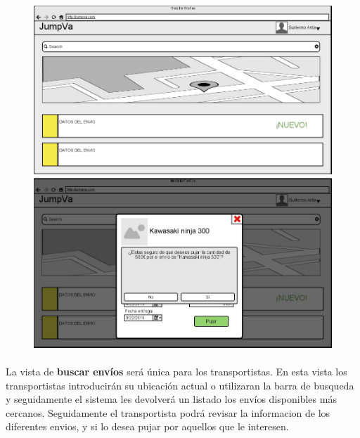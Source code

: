 \documentclass[10pt, a4paper,spanish]{article}
\begin{document}
			\begin{figure}[H]
				\centering
				\begin{minipage}[b]{0.7\textwidth}
					\includegraphics[width=\textwidth]{res/BuscarEnviosTransportista.png}

				\end{minipage}
				\begin{minipage}[b]{0.7\textwidth}
					\includegraphics[width=\textwidth]{res/ConfirmacionDePuja.png}

				\end{minipage}
			\end{figure}

			\paragraph{}
			La vista de \textbf{buscar envíos} será única para los transportistas. En esta vista los transportistas introducirán su ubicación actual o utilizaran la barra de busqueda y seguidamente el sistema les devolverá un listado los envíos disponibles más cercanos. Seguidamente el transportista podrá revisar la informacion de los diferentes envios, y si lo desea pujar por aquellos que le interesen.
\end{document}
